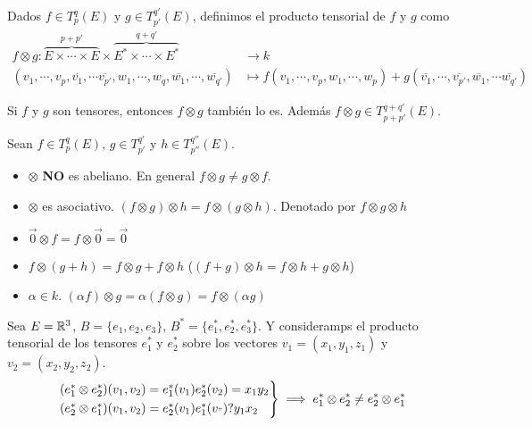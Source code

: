 \begin{defi}
	Dados $f \in T_p^q(E)$ y $g \in T_{p'}^{q'}(E)$, definimos el producto
	tensorial de $f$ y $g$ como
	\[
		\begin{aligned}
			f \otimes g \colon \overbrace{E \times \cdots \times E}^{p+p'}
			\times \overbrace{E^* \times \cdots \times E^*}^{q+q'} &\to k \\
			(v_1, \cdots, v_p, \overline{v_1}, \cdots \overline{v_{p'}},
			w_1, \cdots, w_q, \overline{w_1}, \cdots, \overline{w_{q'}})
			&\mapsto f(v_1, \cdots, v_p, w_1, \cdots, w_p) +
			g(\overline{v_1}, \cdots, \overline{v_{p'}}, \overline{w_1}, \cdots
			\overline{w_{q'}})
		\end{aligned}
	\]
\end{defi}
\begin{obs}
	Si $f$ y $g$ son tensores, entonces $f \otimes g$ también lo es. Además
	$f \otimes g \in T_{p+p'}^{q+q'}(E)$.
\end{obs}
\begin{prop}
	Sean  $f \in T_p^q(E)$, $g \in T_{p'}^{q'}$ y $h \in T_{p''}^{q''}(E)$.
	\begin{itemize}
		\item $\otimes$ {\bfseries NO} es abeliano. En general $f \otimes g \neq
		g \otimes f$.
		\item $\otimes$ es asociativo. $(f \otimes g) \otimes h = f \otimes (g
		\otimes h)$. Denotado por $f \otimes g \otimes h$
		\item $\vec{0} \otimes f = f \otimes \vec{0} = \vec{0}$
		\item $f \otimes (g + h) = f \otimes g + f\otimes h$ \quad ($(f+g) \otimes
		h = f \otimes h + g \otimes h$)
		\item $\alpha \in k$. $(\alpha f) \otimes g = \alpha(f \otimes g) =
		f \otimes (\alpha g)$
	\end{itemize}
\end{prop}
\begin{example}
	Sea $E = \mathbb{R}^3$, $B = \{e_1, e_2, e_3\}$, $B^* = \{ e_1^*, e_2^*, e_3^*\}$.
	Y consideramps el producto tensorial de los tensores $e_1^*$ y $e_2^*$ sobre
	los vectores $v_1 = (x_1, y_1, z_1)$ y $v_2 = (x_2,y_2,z_2)$.
	\[
		\begin{rcases}
			(e_1^* \otimes e_2^*)(v_1, v_2) = e_1^*(v_1)e_2^*(v_2) = x_1y_2 \\
			(e_2^* \otimes e_1^*)(v_1, v_2) = e_2^*(v_1)e_1^*(v_") ? y_1x_2
		\end{rcases}
		\implies e_1^* \otimes e_2^* \neq e_2^* \otimes e_1^*
	\]
\end{example}
